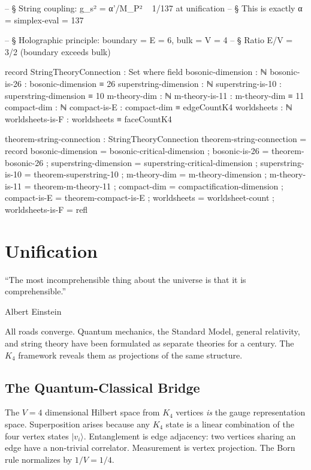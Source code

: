 \documentclass[11pt,a4paper]{book}
\begin{document}
\begin{code}
-- § String coupling: g_s² = α'/M_P² ~ 1/137 at unification
-- § This is exactly α = simplex-eval = 137

-- § Holographic principle: boundary = E = 6, bulk = V = 4
-- § Ratio E/V = 3/2 (boundary exceeds bulk)

record StringTheoryConnection : Set where
  field
    bosonic-dimension      : ℕ
    bosonic-is-26         : bosonic-dimension ≡ 26
    superstring-dimension  : ℕ
    superstring-is-10     : superstring-dimension ≡ 10
    m-theory-dim          : ℕ
    m-theory-is-11        : m-theory-dim ≡ 11
    compact-dim           : ℕ
    compact-is-E          : compact-dim ≡ edgeCountK4
    worldsheets           : ℕ
    worldsheets-is-F      : worldsheets ≡ faceCountK4

theorem-string-connection : StringTheoryConnection
theorem-string-connection = record
  { bosonic-dimension     = bosonic-critical-dimension
  ; bosonic-is-26         = theorem-bosonic-26
  ; superstring-dimension = superstring-critical-dimension
  ; superstring-is-10     = theorem-superstring-10
  ; m-theory-dim          = m-theory-dimension
  ; m-theory-is-11        = theorem-m-theory-11
  ; compact-dim           = compactification-dimension
  ; compact-is-E          = theorem-compact-is-E
  ; worldsheets           = worldsheet-count
  ; worldsheets-is-F      = refl }
\end{code}

\chapter{Unification}
\label{ch:unification}

\epigraph{``The most incomprehensible thing about the universe is that it is comprehensible.''}{Albert Einstein}

All roads converge. Quantum mechanics, the Standard Model, general relativity, and string theory have been formulated as separate theories for a century. The $K_4$ framework reveals them as projections of the same structure.

\section{The Quantum-Classical Bridge}
\label{sec:qm-sm-bridge}

The $V = 4$ dimensional Hilbert space from $K_4$ vertices \emph{is} the gauge representation space. Superposition arises because any $K_4$ state is a linear combination of the four vertex states $|v_i\rangle$. Entanglement is edge adjacency: two vertices sharing an edge have a non-trivial correlator. Measurement is vertex projection. The Born rule normalizes by $1/V = 1/4$.
\end{document}

